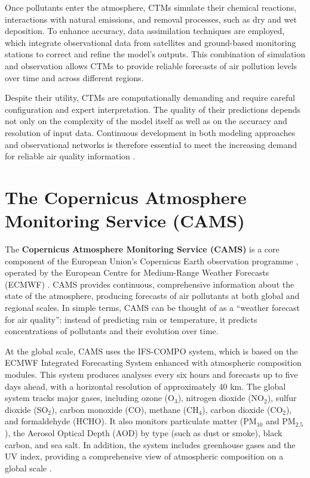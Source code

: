 Once pollutants enter the atmosphere, CTMs simulate their chemical reactions, interactions with natural emissions, and removal processes, such as dry and wet deposition. To enhance accuracy, data assimilation techniques are employed, which integrate observational data from satellites and ground-based monitoring stations to correct and refine the model’s outputs. This combination of simulation and observation allows CTMs to provide reliable forecasts of air pollution levels over time and across different regions.

Despite their utility, CTMs are computationally demanding and require careful configuration and expert interpretation. The quality of their predictions depends not only on the complexity of the model itself as well as on the accuracy and resolution of input data. Continuous development in both modeling approaches and observational networks is therefore essential to meet the increasing demand for reliable air quality information \cite{sokhi2021advances}.

\section{The Copernicus Atmosphere Monitoring Service (CAMS)}

The \textbf{Copernicus Atmosphere Monitoring Service (CAMS)} is a core component of the European Union’s Copernicus Earth observation programme \cite{copernicusCopernicus}, operated by the European Centre for Medium-Range Weather Forecasts (ECMWF) \cite{ecmwfECMWF}. 
CAMS provides continuous, comprehensive information about the state of the atmosphere, producing forecasts of air pollutants at both global and regional scales. 
In simple terms, CAMS can be thought of as a “weather forecast for air quality”: instead of predicting rain or temperature, it predicts concentrations of pollutants and their evolution over time.

At the global scale, CAMS uses the IFS-COMPO system, which is based on the ECMWF Integrated Forecasting System enhanced with atmospheric composition modules. This system produces analyses every six hours and forecasts up to five days ahead, with a horizontal resolution of approximately 40 km. The global system tracks major gases, including ozone (O$_3$), nitrogen dioxide (NO$_2$), sulfur dioxide (SO$_2$), carbon monoxide (CO), methane (CH$_4$), carbon dioxide (CO$_2$), and formaldehyde (HCHO). It also monitors particulate matter (PM$_{10}$ and PM$_{2.5}$), the Aerosol Optical Depth (AOD) by type (such as dust or smoke), black carbon, and sea salt. In addition, the system includes greenhouse gases and the UV index, providing a comprehensive view of atmospheric composition on a global scale \cite{copernicusTechnicalNote}.

